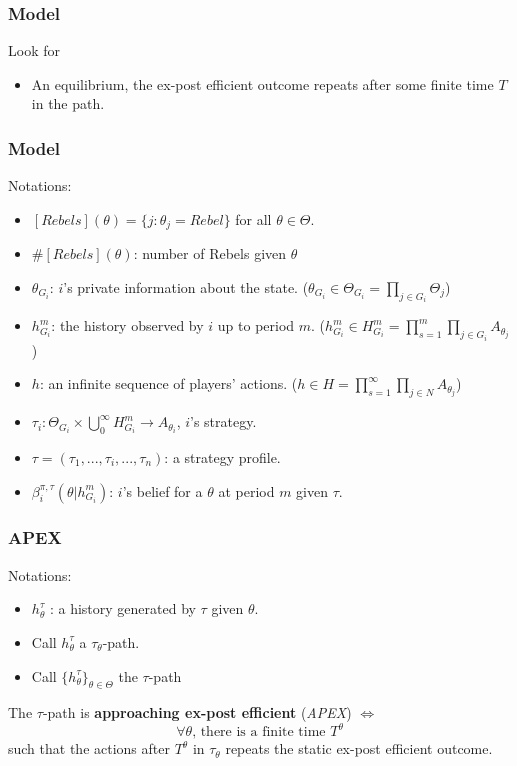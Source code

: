 \documentclass[9pt]{beamer}
\begin{document}
\begin{frame}
  \frametitle{Model}

Look for
\begin{itemize}
\item An equilibrium, the ex-post efficient outcome repeats after some finite time $T$ in the path.
\end{itemize}

\end{frame}






\begin{frame}
  \frametitle{Model}

Notations:
\begin{itemize}
\item $[Rebels](\theta)=\{j:\theta_j=Rebel\}$ for all $\theta\in \Theta$. 
\item $\# [Rebels](\theta)$: number of Rebels given $\theta$ \pause
\item $\theta_{G_i}$: $i$'s private information about the state. ($\theta_{G_i}\in \Theta_{G_i}=\prod_{j\in G_i}\Theta_j$)
\item $h^{m}_{G_i}$: the history observed by $i$ up to period $m$. ($h^{m}_{G_i}\in H^{m}_{G_i}=\prod^m_{s=1}\prod_{j\in G_i}A_{\theta_j}$)
\item $h$: an infinite sequence of players' actions. ($h\in H=\prod^{\infty}_{s=1}\prod_{j\in N}A_{\theta_j}$) \pause 
\item $\tau_i:\Theta_{G_i}\times \bigcup^{\infty}_{0} H^{m}_{G_i} \rightarrow A_{\theta_i}$, $i$'s strategy.
\item $\tau=(\tau_1,...,\tau_i,...,\tau_n)$: a strategy profile. \pause
\item $\beta^{\pi,\tau}_i(\theta|h^{m}_{G_i})$: $i$'s belief for a $\theta$ at period $m$ given $\tau$.

 
\end{itemize}

\end{frame}

\begin{frame}
  \frametitle{APEX}
Notations:
\begin{itemize}
\item $h^{\tau}_{\theta}$ : a history generated by $\tau$ given $\theta$.
\item Call $h^{\tau}_{\theta}$ a $\tau_{\theta}$-path.
\item Call $\{h^{\tau}_{\theta}\}_{\theta\in \Theta}$ the $\tau$-path
\end{itemize}


\begin{definition}
The $\tau$-path is \textbf{approaching ex-post efficient} (\textit{APEX}) $\Leftrightarrow$ 
\[\text{$\forall\theta$,  there is a finite time $T^{\theta}$}\] 
such that the actions after $T^{\theta}$ in $\tau_{\theta}$ repeats the static ex-post efficient outcome.
\end{definition}
 


\end{frame}
\end{document}
